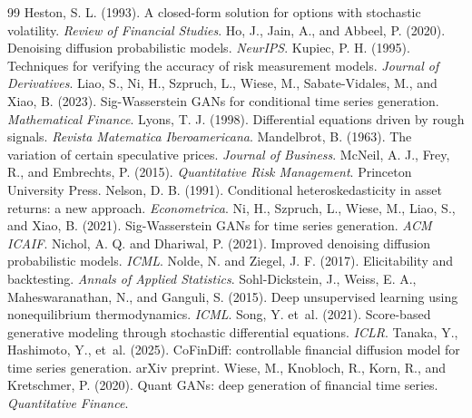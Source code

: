 \documentclass[letterpaper]{article}
\begin{document}
\begin{thebibliography}{99}
 Heston, S. L. (1993). A closed-form solution for options with stochastic volatility. \emph{Review of Financial Studies}.
 Ho, J., Jain, A., and Abbeel, P. (2020). Denoising diffusion probabilistic models. \emph{NeurIPS}.
 Kupiec, P. H. (1995). Techniques for verifying the accuracy of risk measurement models. \emph{Journal of Derivatives}.
 Liao, S., Ni, H., Szpruch, L., Wiese, M., Sabate-Vidales, M., and Xiao, B. (2023). Sig-Wasserstein GANs for conditional time series generation. \emph{Mathematical Finance}.
 Lyons, T. J. (1998). Differential equations driven by rough signals. \emph{Revista Matematica Iberoamericana}.
 Mandelbrot, B. (1963). The variation of certain speculative prices. \emph{Journal of Business}.
 McNeil, A. J., Frey, R., and Embrechts, P. (2015). \emph{Quantitative Risk Management}. Princeton University Press.
 Nelson, D. B. (1991). Conditional heteroskedasticity in asset returns: a new approach. \emph{Econometrica}.
 Ni, H., Szpruch, L., Wiese, M., Liao, S., and Xiao, B. (2021). Sig-Wasserstein GANs for time series generation. \emph{ACM ICAIF}.
 Nichol, A. Q. and Dhariwal, P. (2021). Improved denoising diffusion probabilistic models. \emph{ICML}.
 Nolde, N. and Ziegel, J. F. (2017). Elicitability and backtesting. \emph{Annals of Applied Statistics}.
 Sohl-Dickstein, J., Weiss, E. A., Maheswaranathan, N., and Ganguli, S. (2015). Deep unsupervised learning using nonequilibrium thermodynamics. \emph{ICML}.
 Song, Y. et~al. (2021). Score-based generative modeling through stochastic differential equations. \emph{ICLR}.
 Tanaka, Y., Hashimoto, Y., et~al. (2025). CoFinDiff: controllable financial diffusion model for time series generation. arXiv preprint.
 Wiese, M., Knobloch, R., Korn, R., and Kretschmer, P. (2020). Quant GANs: deep generation of financial time series. \emph{Quantitative Finance}.

\end{thebibliography}
\end{document}
